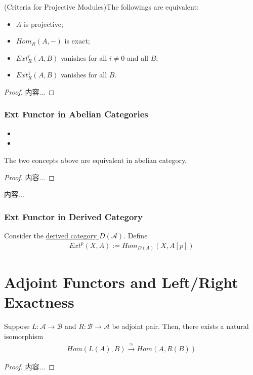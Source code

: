 \documentclass[Total.tex]{subfiles}
\begin{document}
				\begin{proposition}
					(Criteria for Projective Modules)The followings are equivalent:
					\begin{itemize}
						\item $A$ is projective;
						\item $Hom_R(A,-)$ is exact;
						\item $Ext_R^i(A,B)$ vanishes for all $i\not=0$ and all $B$;
						\item $Ext^1_R(A,B)$ vanishes for all $B$.
					\end{itemize}
				\end{proposition}
				\begin{proof}
					内容...
				\end{proof}
			\subsubsection{Ext Functor in Abelian Categories}
				\begin{Def}
					\begin{itemize}
						\item 
						\item 
					\end{itemize}
				\end{Def}
				\begin{lemma}
					The two concepts above are equivalent in abelian category.
				\end{lemma}
				\begin{proof}
					内容...
				\end{proof}
				\begin{example}
					内容...
				\end{example}
			\subsubsection{Ext Functor in Derived Category}
				\begin{Def}
					Consider the \underline{derived category $D(\mathcal{A})$}. Define
					\begin{gather*}
						Ext^p(X,A):=Hom_{D(A)}(X,A[p])
					\end{gather*}
				\end{Def}
		\section{Adjoint Functors and Left/Right Exactness}
			\begin{theorem}
				Suppose $L:\mathcal{A}\rightarrow \mathcal{B}$ and $R:\mathcal{B}\rightarrow \mathcal{A}$ be adjoint pair. Then, there exists a natural isomorphism
				\begin{gather*}
					Hom(L(A),B)\stackrel{\cong}{\rightarrow} Hom(A,R(B))
				\end{gather*}
			\end{theorem}
			\begin{proof}
				内容...
			\end{proof}
			
\end{document}
